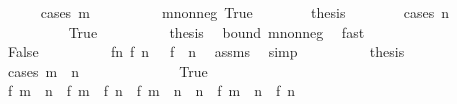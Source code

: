 \begin{isabellebody}
\ \ \ \ \isamarkupfalse%
\ {\isacharparenleft}{\kern0pt}cases\ {\isachardoublequoteopen}m\ {\isasymge}\ {}{\isachardoublequoteclose}{\isacharparenright}{\kern0pt}\isanewline
\ \ \ \ \ \ \isamarkupfalse%
\ m{\isacharunderscore}{\kern0pt}nonneg{\isacharcolon}{\kern0pt}\ True\isanewline
\ \ \ \ \ \ \isamarkupfalse%
\ {\isacharquery}{\kern0pt}thesis\isanewline
\ \ \ \ \ \ \isamarkupfalse%
\ {\isacharparenleft}{\kern0pt}cases\ {\isachardoublequoteopen}n\ {\isasymge}\ {}{\isachardoublequoteclose}{\isacharparenright}{\kern0pt}\isanewline
\ \ \ \ \ \ \ \ \isamarkupfalse%
\ True\isanewline
\ \ \ \ \ \ \ \ \isamarkupfalse%
\ {\isacharquery}{\kern0pt}thesis\ \isamarkupfalse%
\ bound\ m{\isacharunderscore}{\kern0pt}nonneg\ \isamarkupfalse%
\ fast\isanewline
\ \ \ \ \ \ \isamarkupfalse%
\isanewline
\ \ \ \ \ \ \ \ \isamarkupfalse%
\ False\isanewline
\ \ \ \ \ \ \ \ \isamarkupfalse%
\ f{\isacharunderscore}{\kern0pt}n{\isacharcolon}{\kern0pt}\ {\isachardoublequoteopen}f\ n\ {\isacharequal}{\kern0pt}\ {\isacharminus}{\kern0pt}\ f\ {\isacharparenleft}{\kern0pt}{\isacharminus}{\kern0pt}\ n{\isacharparenright}{\kern0pt}{\isachardoublequoteclose}\ \isamarkupfalse%
\ assms\ \isamarkupfalse%
\ simp\isanewline
\ \ \ \ \ \ \ \ \isamarkupfalse%
\ {\isacharquery}{\kern0pt}thesis\isanewline
\ \ \ \ \ \ \ \ \isamarkupfalse%
\ {\isacharparenleft}{\kern0pt}cases\ {\isachardoublequoteopen}m\ {\isacharplus}{\kern0pt}\ n\ {\isasymge}\ {}{\isachardoublequoteclose}{\isacharparenright}{\kern0pt}\isanewline
\ \ \ \ \ \ \ \ \ \ \isamarkupfalse%
\ True\isanewline
\ \ \ \ \ \ \ \ \ \ \isamarkupfalse%
\ {\isachardoublequoteopen}{\isasymbar}f\ {\isacharparenleft}{\kern0pt}m\ {\isacharplus}{\kern0pt}\ n{\isacharparenright}{\kern0pt}\ {\isacharminus}{\kern0pt}\ {\isacharparenleft}{\kern0pt}f\ m\ {\isacharplus}{\kern0pt}\ f\ n{\isacharparenright}{\kern0pt}{\isasymbar}\ {\isacharequal}{\kern0pt}\ {\isasymbar}f\ {\isacharparenleft}{\kern0pt}m\ {\isacharplus}{\kern0pt}\ n\ {\isacharplus}{\kern0pt}\ {\isacharminus}{\kern0pt}n{\isacharparenright}{\kern0pt}\ {\isacharminus}{\kern0pt}\ {\isacharparenleft}{\kern0pt}f\ {\isacharparenleft}{\kern0pt}m\ {\isacharplus}{\kern0pt}\ n{\isacharparenright}{\kern0pt}\ {\isacharplus}{\kern0pt}\ f\ {\isacharparenleft}{\kern0pt}{\isacharminus}{\kern0pt}n{\isacharparenright}{\kern0pt}{\isacharparenright}{\kern0pt}{\isasymbar}{\isachardoublequoteclose}\ \isamarkupfalse%

\end{isabellebody}
